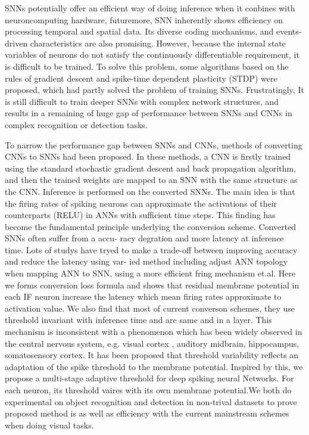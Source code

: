 \documentclass{article}
\begin{document}
SNNs potentially offer an efficient way of doing inference when it conbines with neuroncomputing hardware, futuremore, SNN inherently shows efficiency on processing temporal and spatial data. Its  
diverse coding mechanisms, and events-driven characteristics are also promising. However, because the internal state
variables of neurons do not satisfy the continuously differentiable
requirement, it is difficult to be trained. To solve this problem,
some algorithms based on the rules of gradient descent
and spike-time dependent plasticity (STDP) were proposed, which had partly solved the problem of training SNNs. 
Frustratingly, It is still difficult to train deeper SNNs with complex network 
structures, and results in a remaining of huge gap of
performance between SNNs and CNNs in complex recognition or detection tasks.

To narrow the performance gap between SNNs and CNNs, methods of converting CNNs to SNNs had been proposed. 
In these methods, a CNN is firstly trained using the standard stochastic gradient
descent and back propagation algorithm, and then the trained
weights are mapped to an SNN with the same structure as the
CNN. Inference is performed on the converted SNNs. The main idea is that the firing rates of spiking neurons can approximate the
activations of their counterparts (RELU) in ANNs  with sufficient time
steps. This finding has become the fundamental principle
underlying the conversion scheme. Converted SNNs often suffer from a accu-
racy degration and more latency at inference time. Lots of studys have tryed to
make a trade-off between improving accuracy and reduce the latency using var-
ied method including adjust ANN topology when mapping ANN to SNN, using
a more efficient fring mechanism et.al. Here we forms conversion loss formula and shows that residual membrane potential in each IF neuron 
increase the latency which mean firing rates approximate to activation value. We also find that most of current converson schemes,
they use threshold invariant with inference time and are same and in a layer. This mechanism is inconsistent with a phenomenon which has been widely observed in 
the central nervous system, e.g. visual cortex , auditory 
midbrain, hippocampus, somatosensory cortex.  It has 
been proposed that threshold variability reflects 
an adaptation of the spike threshold to the membrane potential. Inspired by this, we propose a multi-stage adaptive threshold for deep spiking neural Networks. 
For each neuron, its threshold vaires with its own membrane potential.We both do experimental on object recognition and detection in non-trival datasets to prove
proposed method is as well as efficiency with the current mainstream schemes when doing visual tasks.
\end{document}
